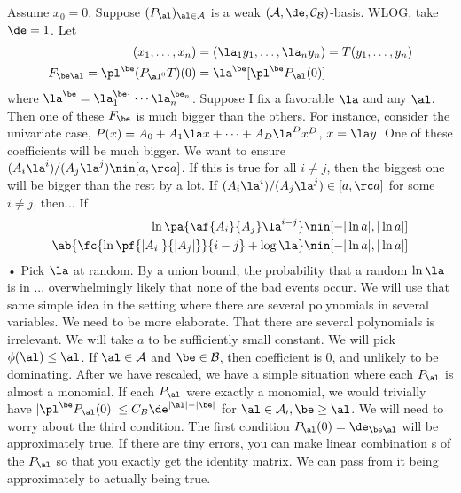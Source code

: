 Assume $x_0=0$. Suppose $(P_\al)_{\al\in \cal A}$ is a weak $(\cal A,\de,C_B)$-basis. WLOG, take $\de=1$.
Let 
\begin{align}
(x_1,\ldots, x_n) &= (\la_1 y_1,\ldots, \la_n y_n) = T(y_1,\ldots, y_n)\\
F_{\be\al} = \pl^\be (P_{\al^0}T)(0) &= \la^{\be} [\pl^\be P_\al(0)]
\end{align}
where $\la^\be = \la_1^{\be_1}\cdots \la_n^{\be_n}$. Suppose I fix a favorable $\la$ and any $\al$. Then one of these $F_\be$ is much bigger than the others. For instance, consider the univariate case, $P(x) = A_0+A_1\la x+\cdots +A_D\la^Dx^D$, $x=\la y$. 
One of these coefficients will be much bigger. We want to ensure $(A_i\la^i)/(A_j\la^j)\nin [a,\rc a]$. If this is true for all $i\ne j$, then the biggest one will be bigger than the rest by a lot. 
If $(A_i\la^i)/(A_j\la^j)\in [a,\rc a]$ for some $i\ne j$, then...
If 
\begin{align}
\ln \pa{\af{A_i}{A_j}\la^{i-j} }&\nin [-|\ln a|, |\ln a|]\\
\ab{\fc{\ln \pf{|A_i|}{|A_j|}}{i-j} + \log \la }
&\nin [-|\ln a|, |\ln a|]
\end{align}•
Pick $\la$ at random. %
By a union bound, the probability that a random $\ln \la$ is in ... overwhelmingly likely that none of the bad events occur. We will use that same simple idea in the setting where there are several polynomials in several variables. We need to be more elaborate. That there are several polynomials is irrelevant. We will take $a$ to be sufficiently small constant. 
We will pick $\phi(\al)\le \al$. If $\al\in \cal A$ and $\be \in \cal B$, then coefficient is 0, and unlikely to be dominating. After we have rescaled, we have a simple situation where each $P_\al$ is almost a monomial. If each $P_\al$ were exactly a monomial, we would trivially have $|\pl^\be P_\al(0)|\le C_B \de^{|\al|-|\be|}$ for $\al\in \cal A_0,\be \ge \al$. We will need to worry about the third condition. The first condition $P_\al(0) = \de_{\be\al}$ will be approximately true. If there are tiny errors, you can make linear combination s of the $P_\al$ so that you exactly get the identity matrix. 
We can pass from it being approximately to actually being true. 

